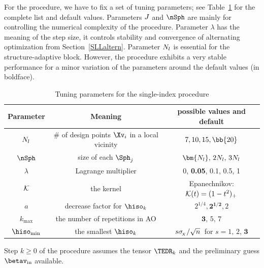 For the procedure, we have to fix a set of tuning parameters; see Table~\ref{TdefSI}
for the complete list and default values.
%
Parameters \( J \) and \( \nSph \) are mainly for controlling the numerical
complexity of the procedure.
Parameter \( \lambda \) has the meaning of the step size, 
it controls stability and convergence of alternating optimization
from Section~\ref{SLLaltern}.
Parameter \( N_{l} \) is essential for the structure-adaptive block.
However, the procedure exhibits a very stable performance 
for a minor variation of the parameters around the default values (in boldface).
%
\begin{table}[h]
\begin{tabular}{c|c|c}
        \hline
        Parameter & Meaning & possible values and default \\
        \hline
        \( N_{l} \) & \( \# \) of design points \( \Xv_{i} \) in a local vicinity & \( 7, 10, 15, \bb{20} \) \\
		\( \nSph \) & size of each \( \Sph_{j} \)		& \( \bm{\nmin}, \, 2\nmin, \, 3\nmin \) \\
		\( \lambda \) & Lagrange multiplier 		& 0, \textbf{0.05}, {0.1}, 0.5, 1 \\
		\( \mathcal{K} \) & the kernel & Epanechnikov: \( \mathcal{K}(t) = (1-t^{2})_{+} \) \\
		\( a \)	& decrease factor for \( \hiso_{k} \) & \( 2^{1/4}, \bm{2^{1/2}}, 2 \) \\
		\( k_{\max} \) & the number of repetitions in AO & \( \bm{3}, \, 5, \, 7 \) \\
		\( \hiso_{\min} \) & the smallest \( \hiso_{k} \) & \( s \sigma_{\!_{X}}/\sqrt{n} \, \) for \( s=1, \, 2, \, \bm{3} \) \\
		\hline
    \end{tabular}
\caption{Tuning parameters for the single-index procedure}    
\label{TdefSI}
\end{table}

Step \( k \geq 0 \) of the procedure assumes the tensor \( \TEDR_{k} \) and the preliminary guess \( \betav_{\init} \)
available.

